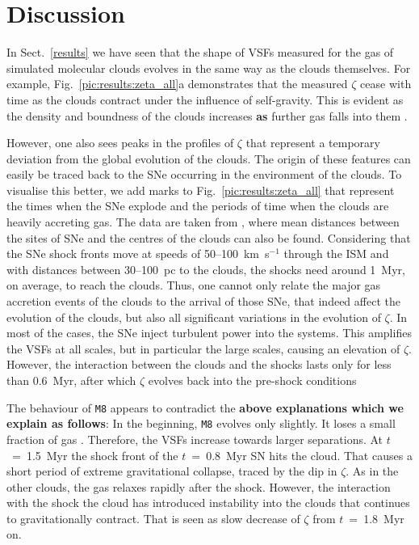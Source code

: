 \section{Discussion}\label{discussion}

In Sect.~\ref{results} we have seen that the shape of VSFs measured for the gas of simulated molecular clouds evolves in the same way as the clouds themselves.
For example, Fig.~\ref{pic:results:zeta_all}a demonstrates that the measured $\zeta$ cease with time as the clouds contract under the influence of self-gravity.
This is evident as the density and boundness of the clouds increases \textbf{as} further gas falls into them .

However, one also sees peaks in the profiles of $\zeta$ that represent a temporary deviation from the global evolution of the clouds.
The origin of these features can easily be traced back to the SNe occurring in the environment of the clouds.
To visualise this better, we add marks to Fig.~\ref{pic:results:zeta_all} that represent the times when the SNe explode and the periods of time when the clouds are heavily accreting gas.
The data are taken from , where mean distances between the sites of SNe and the centres of the clouds can also be found.
Considering that the SNe shock fronts move at speeds of 50--100~km~s$^{-1}$ through the ISM and with distances between 30--100~pc to the clouds, the shocks need around 1~Myr, on average, to reach the clouds.
Thus, one cannot only relate the major gas accretion events of the clouds to the arrival of those SNe, that indeed affect the evolution of the clouds, but also all significant variations in the evolution of $\zeta$.
In most of the cases, the SNe inject turbulent power into the systems.
This amplifies the VSFs at all scales, but in particular the large scales, causing an elevation of $\zeta$.
However, the interaction between the clouds and the shocks lasts only for less than 0.6~Myr, after which $\zeta$ evolves back into the pre-shock conditions

The behaviour of \texttt{M8} appears to contradict the \textbf{above explanations which we explain as follows}:
In the beginning, \texttt{M8} evolves only slightly.
It loses a small fraction of gas .
Therefore, the VSFs increase towards larger separations.
At $t$~=~1.5~Myr the shock front of the $t$~=~0.8~Myr SN hits the cloud.
That causes a short period of extreme gravitational collapse, traced by the dip in $\zeta$.
As in the other clouds, the gas relaxes rapidly after the shock.
However, the interaction with the shock the cloud has introduced instability into the clouds that continues to gravitationally contract.
That is seen as slow decrease of $\zeta$ from $t$~=~1.8~Myr on. 

